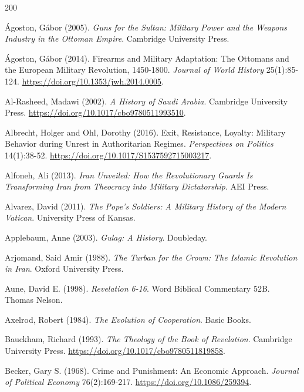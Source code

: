 \documentclass[11pt,letterpaper]{article}
\theoremstyle{definition}
\theoremstyle{remark}
\begin{document}
\begin{thebibliography}{200}
\small
\setlength{\itemsep}{2pt}
\raggedright

\'Agoston, G\'abor (2005). \emph{Guns for the Sultan: Military Power and the Weapons Industry in the Ottoman Empire}. Cambridge University Press.

\'Agoston, G\'abor (2014). Firearms and Military Adaptation: The Ottomans and the European Military Revolution, 1450-1800. \emph{Journal of World History} 25(1):85-124. \url{https://doi.org/10.1353/jwh.2014.0005}.

Al-Rasheed, Madawi (2002). \emph{A History of Saudi Arabia}. Cambridge University Press. \url{https://doi.org/10.1017/cbo9780511993510}.

Albrecht, Holger and Ohl, Dorothy (2016). Exit, Resistance, Loyalty: Military Behavior during Unrest in Authoritarian Regimes. \emph{Perspectives on Politics} 14(1):38-52. \url{https://doi.org/10.1017/S1537592715003217}.

Alfoneh, Ali (2013). \emph{Iran Unveiled: How the Revolutionary Guards Is Transforming Iran from Theocracy into Military Dictatorship}. AEI Press.

Alvarez, David (2011). \emph{The Pope's Soldiers: A Military History of the Modern Vatican}. University Press of Kansas.

Applebaum, Anne (2003). \emph{Gulag: A History}. Doubleday.

Arjomand, Said Amir (1988). \emph{The Turban for the Crown: The Islamic Revolution in Iran}. Oxford University Press.

Aune, David E. (1998). \emph{Revelation 6-16}. Word Biblical Commentary 52B. Thomas Nelson.

Axelrod, Robert (1984). \emph{The Evolution of Cooperation}. Basic Books.

Bauckham, Richard (1993). \emph{The Theology of the Book of Revelation}. Cambridge University Press. \url{https://doi.org/10.1017/cbo9780511819858}.

Becker, Gary S. (1968). Crime and Punishment: An Economic Approach. \emph{Journal of Political Economy} 76(2):169-217. \url{https://doi.org/10.1086/259394}.


\end{thebibliography}
\end{document}
